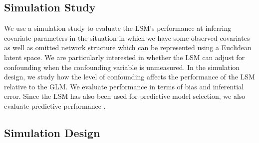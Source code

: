 \documentclass[11pt]{article}
\begin{document}
\subsection{Simulation Study}

We use a simulation study to evaluate the LSM's performance at inferring covariate parameters in the situation in which we have some observed covariates as well as omitted network structure which can be represented using a Euclidean latent space. We are particularly interested in whether the LSM can adjust for confounding when the confounding variable is unmeasured. In the simulation design, we study how the level of confounding affects the performance of the LSM relative to the GLM. We evaluate performance in terms of bias and inferential error. Since the LSM has also been used for predictive model selection, we also evaluate predictive performance  \citep{ward2013gravity, fletcher2011social, fletcher2013network, chiu2011unifying}.

\subsection{Simulation Design}
\end{document}
